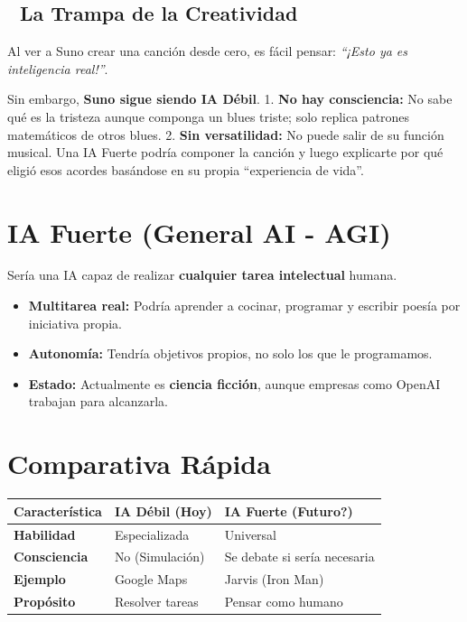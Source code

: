 \documentclass[
  spanish,
  letterpaper,
  DIV=11,
  numbers=noendperiod,
  oneside]{scrreprt}
\newcounter{none} %
\providecommand{\tightlist}{%
  \setlength{\itemsep}{0pt}\setlength{\parskip}{0pt}}
\begin{document}
\subsection{🧠 La Trampa de la
Creatividad}\label{la-trampa-de-la-creatividad}

Al ver a Suno crear una canción desde cero, es fácil pensar:
\emph{``¡Esto ya es inteligencia real!''}.

Sin embargo, \textbf{Suno sigue siendo IA Débil}. 1. \textbf{No hay
consciencia:} No sabe qué es la tristeza aunque componga un blues
triste; solo replica patrones matemáticos de otros blues. 2. \textbf{Sin
versatilidad:} No puede salir de su función musical. Una IA Fuerte
podría componer la canción y luego explicarte por qué eligió esos
acordes basándose en su propia ``experiencia de vida''.

\section{IA Fuerte (General AI - AGI)}\label{ia-fuerte-general-ai---agi}

Sería una IA capaz de realizar \textbf{cualquier tarea intelectual}
humana.

\begin{itemize}
\tightlist
\item
  \textbf{Multitarea real:} Podría aprender a cocinar, programar y
  escribir poesía por iniciativa propia.
\item
  \textbf{Autonomía:} Tendría objetivos propios, no solo los que le
  programamos.
\item
  \textbf{Estado:} Actualmente es \textbf{ciencia ficción}, aunque
  empresas como OpenAI trabajan para alcanzarla.
\end{itemize}

\section{Comparativa Rápida}\label{comparativa-ruxe1pida}

{\def\LTcaptype{none} %
\begin{longtable}[]{@{}lll@{}}
\toprule\noalign{}
Característica & IA Débil (Hoy) & IA Fuerte (Futuro?) \\
\midrule\noalign{}
\endhead
\bottomrule\noalign{}
\endlastfoot
\textbf{Habilidad} & Especializada & Universal \\
\textbf{Consciencia} & No (Simulación) & Se debate si sería necesaria \\
\textbf{Ejemplo} & Google Maps & Jarvis (Iron Man) \\
\textbf{Propósito} & Resolver tareas & Pensar como humano \\
\end{longtable}
}
\end{document}
